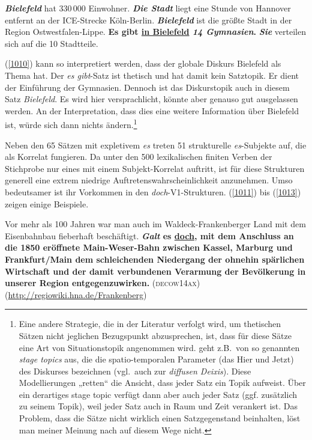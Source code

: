 \begin{exe}
	\ex\label{1010} 

	\textbf{\textit{Bielefeld}} hat 330\,000 Einwohner. \textbf{\textit{Die Stadt}} liegt eine Stunde von Hannover entfernt an der ICE-Strecke Köln-Berlin. 		\textbf{\textit{Bielefeld}} ist die größte Stadt in der Region Ostwestfalen-Lippe. \textbf{Es gibt \ul{in Bielefeld} \textit{14 Gymnasien}.} 		\textbf{\textit{Sie}} verteilen sich auf die 10 Stadtteile.
\end{exe}	
(\ref{1010}) kann so interpretiert werden, dass der globale Diskurs Bielefeld als Thema hat. Der \textit{es gibt}-Satz ist thetisch  und hat damit kein  Satztopik. Er dient der Einführung der Gymnasien. Dennoch ist das Diskurstopik auch in diesem Satz \textit{Bielefeld}. Es wird hier versprachlicht, könnte aber genauso gut ausgelassen werden. An der Interpretation, dass dies eine weitere Information über Bielefeld ist, würde sich dann nichts ändern.\footnote{Eine andere Strategie, die in der Literatur verfolgt wird, um thetischen Sätzen nicht jeglichen Bezugspunkt abzusprechen, ist, dass für diese Sätze eine Art von Situationstopik angenommen wird. \citet[16]{Erteschik-Shir2007} geht z.B.\ von so genannten \textit{stage topics} aus, die die spatio-temporalen Parameter (das Hier und Jetzt) des Diskurses bezeichnen (vgl.\ auch \citealt{Back1995} zur \textit{diffusen Deixis}). Diese Modellierungen „retten“ die Ansicht, dass jeder Satz ein Topik aufweist. Über ein derartiges stage topic verfügt dann aber auch jeder Satz (ggf. zusätzlich zu seinem  Topik), weil jeder Satz auch in Raum und Zeit verankert ist. Das Problem, dass die Sätze nicht wirklich einen Satzgegenstand beinhalten, löst man meiner Meinung nach auf diesem Wege nicht.}

Neben den 65 Sätzen mit expletivem \textit{es} treten 51 strukturelle \textit{es}-Subjekte auf, die als Korrelat  fungieren. Da unter den 500 lexikalischen finiten Verben der Stichprobe nur eines mit einem Subjekt-Korrelat auftritt, ist für diese Strukturen generell eine extrem niedrige Auftretenswahrscheinlichkeit anzunehmen. Umso bedeutsamer ist ihr Vorkommen in den \textit{doch}-V1-Strukturen. (\ref{1011}) bis (\ref{1013}) zeigen einige Beispiele.
	
\begin{exe}
	\ex\label{1011} 

	Vor mehr als 100 Jahren war man auch im Waldeck-Frankenberger Land mit dem Eisenbahnbau fieberhaft beschäftigt. \textbf{\textit{Galt} es 					\ul{doch}, mit dem Anschluss an die 1850 eröffnete Main-Weser-Bahn zwischen Kassel, Marburg und Frankfurt/Main dem schleichenden Niedergang der 	ohnehin spärlichen Wirtschaft und der damit verbundenen Verarmung der Bevölkerung in unserer Region entgegenzuwirken.  	}	  		
	\hfill\hbox{\scshape(decow14ax)}
	\newline
	{\scriptsize(\url{http://regiowiki.hna.de/Frankenberg})}
\end{exe}
	
